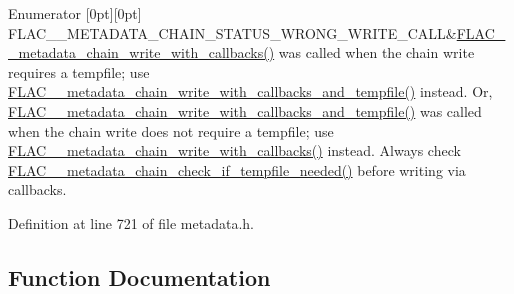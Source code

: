 \begin{DoxyEnumFields}{Enumerator}
[0pt][0pt]{}\mbox{\label{group__flac__metadata__level2_ggafe2a924893b0800b020bea8160fd4531af86670707345e2d02cc84aec059459d0}} 
F\+L\+A\+C\+\_\+\+\_\+\+M\+E\+T\+A\+D\+A\+T\+A\+\_\+\+C\+H\+A\+I\+N\+\_\+\+S\+T\+A\+T\+U\+S\+\_\+\+W\+R\+O\+N\+G\+\_\+\+W\+R\+I\+T\+E\+\_\+\+C\+A\+LL&\mbox{\hyperlink{group__flac__metadata__level2_ga6bf7552940ec2242718d1ab164b89e03}{F\+L\+A\+C\+\_\+\+\_\+metadata\+\_\+chain\+\_\+write\+\_\+with\+\_\+callbacks()}} was called when the chain write requires a tempfile; use \mbox{\hyperlink{group__flac__metadata__level2_ga371beab0d09d5248272bcb8d57de94f3}{F\+L\+A\+C\+\_\+\+\_\+metadata\+\_\+chain\+\_\+write\+\_\+with\+\_\+callbacks\+\_\+and\+\_\+tempfile()}} instead. Or, \mbox{\hyperlink{group__flac__metadata__level2_ga371beab0d09d5248272bcb8d57de94f3}{F\+L\+A\+C\+\_\+\+\_\+metadata\+\_\+chain\+\_\+write\+\_\+with\+\_\+callbacks\+\_\+and\+\_\+tempfile()}} was called when the chain write does not require a tempfile; use \mbox{\hyperlink{group__flac__metadata__level2_ga6bf7552940ec2242718d1ab164b89e03}{F\+L\+A\+C\+\_\+\+\_\+metadata\+\_\+chain\+\_\+write\+\_\+with\+\_\+callbacks()}} instead. Always check \mbox{\hyperlink{group__flac__metadata__level2_ga29a124cceaffce5376d073a032bd1c52}{F\+L\+A\+C\+\_\+\+\_\+metadata\+\_\+chain\+\_\+check\+\_\+if\+\_\+tempfile\+\_\+needed()}} before writing via callbacks. \\
\hline

\end{DoxyEnumFields}


Definition at line 721 of file metadata.\+h.



\subsection{Function Documentation}
\mbox{\label{group__flac__metadata__level2_ga29a124cceaffce5376d073a032bd1c52}} 
